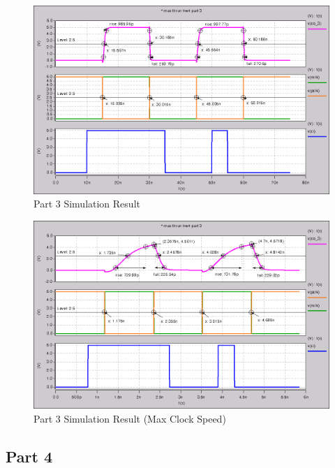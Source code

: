 \documentclass{article}
\begin{document}
\begin{figure}[H]
    \centering
    \includegraphics[width=\linewidth]{../part_3.png}
    \caption{Part 3 Simulation Result}
\end{figure}

\begin{figure}[H]
    \centering
    \includegraphics[width=\linewidth]{../part_3_fast.png}
    \caption{Part 3 Simulation Result (Max Clock Speed)}
\end{figure}

\newpage
\subsection*{Part 4}


\end{document}
